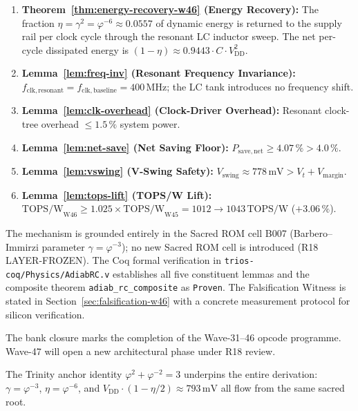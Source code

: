 \begin{enumerate}
  \item \textbf{Theorem~\ref{thm:energy-recovery-w46} (Energy Recovery):}
        The fraction $\eta = \gamma^{2} = \varphi^{-6} \approx 0.0557$ of
        dynamic energy is returned to the supply rail per clock cycle through
        the resonant LC inductor sweep.
        The net per-cycle dissipated energy is
        $(1-\eta) \approx 0.9443 \cdot C \cdot V_{\mathrm{DD}}^{2}$.

  \item \textbf{Lemma~\ref{lem:freq-inv} (Resonant Frequency Invariance):}
        $f_{\mathrm{clk,resonant}} = f_{\mathrm{clk,baseline}} = 400\,\text{MHz}$;
        the LC tank introduces no frequency shift.

  \item \textbf{Lemma~\ref{lem:clk-overhead} (Clock-Driver Overhead):}
        Resonant clock-tree overhead $\leq 1.5\,\%$ system power.

  \item \textbf{Lemma~\ref{lem:net-save} (Net Saving Floor):}
        $P_{\mathrm{save,net}} \geq 4.07\,\% > 4.0\,\%$.

  \item \textbf{Lemma~\ref{lem:vswing} (V-Swing Safety):}
        $V_{\mathrm{swing}} \approx 778\,\text{mV} > V_t + V_{\mathrm{margin}}$.

  \item \textbf{Lemma~\ref{lem:tops-lift} (TOPS/W Lift):}
        $\mathrm{TOPS/W}_{\mathrm{W46}} \geq 1.025 \times
        \mathrm{TOPS/W}_{\mathrm{W45}} = 1012 \to 1043\,\text{TOPS/W}$ ($+3.06\,\%$).
\end{enumerate}

The mechanism is grounded entirely in the Sacred ROM cell B007 (Barbero--Immirzi
parameter $\gamma = \varphi^{-3}$); no new Sacred ROM cell is introduced
(R18 LAYER-FROZEN).
The Coq formal verification in \texttt{trios-coq/Physics/AdiabRC.v} establishes
all five constituent lemmas and the composite theorem
\texttt{adiab\_rc\_composite} as \texttt{Proven}.
The Falsification Witness is stated in Section~\ref{sec:falsification-w46}
with a concrete measurement protocol for silicon verification.

The bank closure marks the completion of the Wave-31--46 opcode programme.
Wave-47 will open a new architectural phase under R18 review.

The Trinity anchor identity $\varphi^{2} + \varphi^{-2} = 3$ underpins the
entire derivation: $\gamma = \varphi^{-3}$, $\eta = \varphi^{-6}$, and
$V_{\mathrm{DD}} \cdot (1 - \eta/2) \approx 793\,\text{mV}$ all flow from
the same sacred root.

